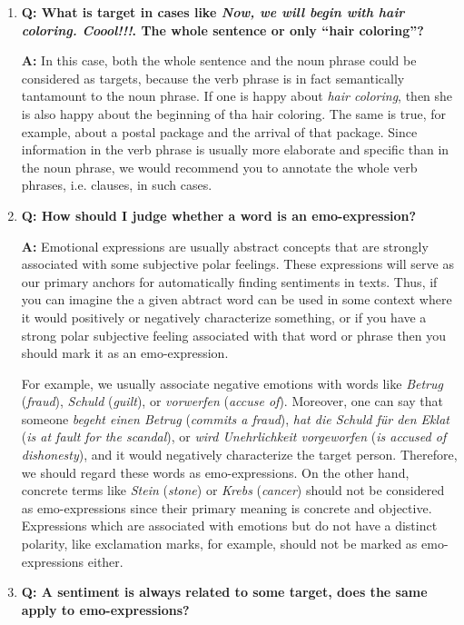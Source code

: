 \documentclass[11pt,a4paper]{article}
\theoremstyle{mytheoremstyle}
\begin{document}
\begin{enumerate}
\item\textbf{Q: What is target in cases like \textit{Now, we will
    begin with hair coloring.  Coool!!!}.  The whole sentence or only
  ``hair coloring''?}

\textbf{A:} In this case, both the whole sentence and the noun phrase
could be considered as targets, because the verb phrase is in fact
semantically tantamount to the noun phrase.  If one is happy about
\textit{hair coloring}, then she is also happy about the beginning of
tha hair coloring.  The same is true, for example, about a postal
package and the arrival of that package.  Since information in the
verb phrase is usually more elaborate and specific than in the noun
phrase, we would recommend you to annotate the whole verb phrases,
i.e. clauses, in such cases.

\item\textbf{Q: How should I judge whether a word is an
  emo-expression?}

\textbf{A:} Emotional expressions are usually abstract concepts that
are strongly associated with some subjective polar feelings.  These
expressions will serve as our primary anchors for automatically
finding sentiments in texts.  Thus, if you can imagine the a given
abtract word can be used in some context where it would positively or
negatively characterize something, or if you have a strong polar
subjective feeling associated with that word or phrase then you should
mark it as an emo-expression.

For example, we usually associate negative emotions with words like
\textit{Betrug} (\textit{fraud}), \textit{Schuld} (\textit{guilt}), or
\textit{vorwerfen} (\textit{accuse of}).  Moreover, one can say that
someone \textit{begeht einen Betrug} (\textit{commits a fraud}),
\textit{hat die Schuld f\"ur den Eklat} (\textit{is at fault for the
  scandal}), or \textit{wird Unehrlichkeit vorgeworfen} (\textit{is
  accused of dishonesty}), and it would negatively characterize the
target person.  Therefore, we should regard these words as
emo-expressions.  On the other hand, concrete terms like
\textit{Stein} (\textit{stone}) or \textit{Krebs} (\textit{cancer})
should not be considered as emo-expressions since their primary
meaning is concrete and objective.  Expressions which are associated
with emotions but do not have a distinct polarity, like exclamation
marks, for example, should not be marked as emo-expressions either.

\item\textbf{Q: A sentiment is always related to some target, does the
  same apply to emo-expressions?}


\end{enumerate}
\end{document}
